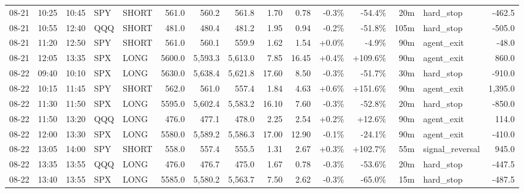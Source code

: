 \documentclass[11pt,a4paper,twoside]{article}
\begin{document}
\begin{landscape}
\begin{center}
\begin{longtable}{>{\color{txtmain}}l l l l l r r r r r r r r >{\color{txtmain}}l r}
08-21 & 10:25 & 10:45 & SPY & SHORT & 561.0 & 560.2 & 561.8 & 1.70 & 0.78 & \textcolor{lossred}{-0.3\%} & \textcolor{lossred}{-54.4\%} & 20m & hard\_stop & \textcolor{lossred}{-462.5} \\
08-21 & 10:55 & 12:40 & QQQ & SHORT & 481.0 & 480.4 & 481.2 & 1.95 & 0.94 & \textcolor{lossred}{-0.2\%} & \textcolor{lossred}{-51.8\%} & 105m & hard\_stop & \textcolor{lossred}{-505.0} \\
08-21 & 11:20 & 12:50 & SPY & SHORT & 561.0 & 560.1 & 559.9 & 1.62 & 1.54 & \textcolor{wingreen}{+0.0\%} & \textcolor{lossred}{-4.9\%} & 90m & agent\_exit & \textcolor{lossred}{-48.0} \\
08-21 & 12:05 & 13:35 & SPX & LONG & 5600.0 & 5,593.3 & 5,613.0 & 7.85 & 16.45 & \textcolor{wingreen}{+0.4\%} & \textcolor{wingreen}{+109.6\%} & 90m & agent\_exit & \textcolor{wingreen}{860.0} \\
08-22 & 09:40 & 10:10 & SPX & LONG & 5630.0 & 5,638.4 & 5,621.8 & 17.60 & 8.50 & \textcolor{lossred}{-0.3\%} & \textcolor{lossred}{-51.7\%} & 30m & hard\_stop & \textcolor{lossred}{-910.0} \\
08-22 & 10:15 & 11:45 & SPY & SHORT & 562.0 & 561.0 & 557.4 & 1.84 & 4.63 & \textcolor{wingreen}{+0.6\%} & \textcolor{wingreen}{+151.6\%} & 90m & agent\_exit & \textcolor{wingreen}{1,395.0} \\
08-22 & 11:30 & 11:50 & SPX & LONG & 5595.0 & 5,602.4 & 5,583.2 & 16.10 & 7.60 & \textcolor{lossred}{-0.3\%} & \textcolor{lossred}{-52.8\%} & 20m & hard\_stop & \textcolor{lossred}{-850.0} \\
08-22 & 11:50 & 13:20 & QQQ & LONG & 476.0 & 477.1 & 478.0 & 2.25 & 2.54 & \textcolor{wingreen}{+0.2\%} & \textcolor{wingreen}{+12.6\%} & 90m & agent\_exit & \textcolor{wingreen}{114.0} \\
08-22 & 12:00 & 13:30 & SPX & LONG & 5580.0 & 5,589.2 & 5,586.3 & 17.00 & 12.90 & \textcolor{lossred}{-0.1\%} & \textcolor{lossred}{-24.1\%} & 90m & agent\_exit & \textcolor{lossred}{-410.0} \\
08-22 & 13:05 & 14:00 & SPY & SHORT & 558.0 & 557.4 & 555.5 & 1.31 & 2.67 & \textcolor{wingreen}{+0.3\%} & \textcolor{wingreen}{+102.7\%} & 55m & signal\_reversal & \textcolor{wingreen}{945.0} \\
08-22 & 13:35 & 13:55 & QQQ & LONG & 476.0 & 476.7 & 475.0 & 1.67 & 0.78 & \textcolor{lossred}{-0.3\%} & \textcolor{lossred}{-53.6\%} & 20m & hard\_stop & \textcolor{lossred}{-447.5} \\
08-22 & 13:40 & 13:55 & SPX & LONG & 5585.0 & 5,580.2 & 5,563.7 & 7.50 & 2.62 & \textcolor{lossred}{-0.3\%} & \textcolor{lossred}{-65.0\%} & 15m & hard\_stop & \textcolor{lossred}{-487.5} \\

\end{longtable}
\end{center}
\end{landscape}
\end{document}
